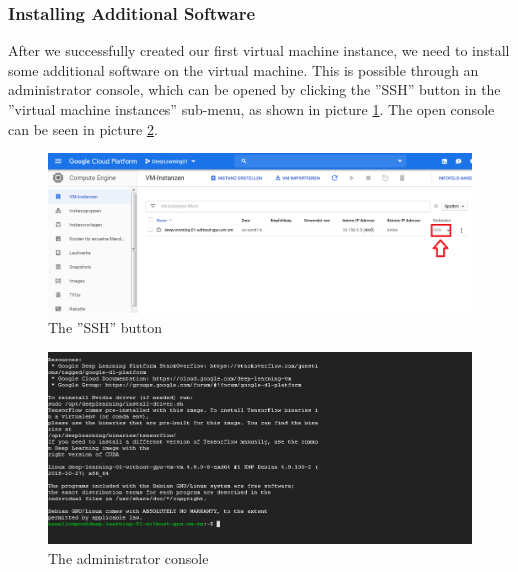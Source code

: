 \documentclass[a4paper]{article}
\begin{document}
\subsubsection{Installing Additional Software}
After we successfully created our first virtual machine instance, we need to install some additional software on the virtual machine. This is possible through an administrator console, which can be opened by clicking the ''SSH'' button in the ''virtual machine instances'' sub-menu, as shown in picture \ref{fig_adminConsole}. The open console can be seen in picture \ref{fig_adminConsole2}.\\
\begin{figure}[H]
	\centerline{\includegraphics[width=\textwidth]{img/adminConsole}}
	\caption{The ''SSH'' button}
	\label{fig_adminConsole}
\end{figure}
\begin{figure}[H]
	\centerline{\includegraphics[width=\textwidth]{img/adminConsole2}}
	\caption{The administrator console}
	\label{fig_adminConsole2}
\end{figure}


\subsection{}
\end{document}
